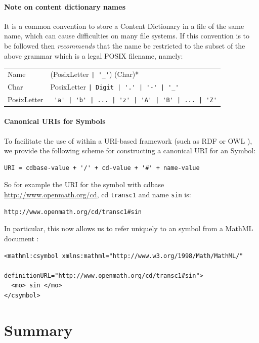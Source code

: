 \paragraph{Note on content dictionary names}

It is a common convention to store a Content Dictionary in a file of
the same name, which can cause difficulties on many file systems.  If
this convention is to be followed then \OM
\emph{recommends} that the name be restricted to the
subset of the above grammar which is a legal POSIX
\cite{POSIX} filename, namely:

\begin{center}
\begin{tabular}{l@{$\longrightarrow$}p{10cm}}
Name & (PosixLetter \lstinline?| '_'?) (Char)*\\
Char &  PosixLetter \lstinline?| Digit | '.' | '-' | '_' ?\\
PosixLetter & \lstinline? 'a' | 'b' | ... | 'z' | 'A' | 'B' | ... | 'Z'?
\end{tabular}
\end{center}


\paragraph{Canonical URIs for Symbols}

To facilitate the use of \OM within a URI-based framework (such as RDF
\cite{rdf} or OWL \cite{owl}), we provide the
following scheme for constructing a canonical URI
for an \OM Symbol:
\begin{lstlisting}
URI = cdbase-value + '/' + cd-value + '#' + name-value
\end{lstlisting}
So for example the URI for the symbol with cdbase \url{http://www.openmath.org/cd}, cd
\lstinline|transc1| and name \lstinline|sin| is:
\begin{lstlisting}
http://www.openmath.org/cd/transc1#sin
\end{lstlisting}
In particular, this now allows us to refer uniquely to an \OM symbol from a
MathML document \cite{MathML_2003}:
\begin{lstlisting}
<mathml:csymbol xmlns:mathml="http://www.w3.org/1998/Math/MathML/"
                definitionURL="http://www.openmath.org/cd/transc1#sin">
  <mo> sin </mo> 
</csymbol>
\end{lstlisting}



\section{Summary}\label{sec_summary}

